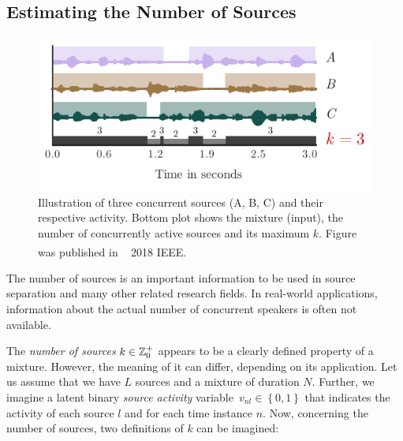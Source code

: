 \subsection{Estimating the Number of Sources}%
\label{sub:count_problemstatement}

\begin{figure}[ht!]
  \centering
  \includegraphics[width=0.8\columnwidth]{Chapters/08_Analysis_CountNet/figures/teaser.pdf}
  \caption{Illustration of three concurrent sources (A, B, C) and their respective activity. Bottom plot shows the mixture (input), the number of concurrently active sources and its maximum \(k\). Figure was published in ~\cite{stoeter18} \textsuperscript{\textregistered}2018 IEEE.}%
  \label{fig:teaser}%
\end{figure}

The number of sources is an important information to be used in source separation and many other related research fields.
In real-world applications, information about the actual number of concurrent speakers is often not available.
\par
The \emph{number of sources} \( k \in \mathbb{Z}^{+}_{0} \) appears to be a clearly defined property of a mixture. 
However, the meaning of it can differ, depending on its application.
Let us assume that we have \(L\) sources and a mixture of duration \(N\).
Further, we imagine a latent binary \textit{source activity} variable~$v_{nl}\in \left\{ 0,1 \right\}$ that indicates the activity of each source \(l\) and for each time instance \(n\).
Now, concerning the number of sources, two definitions of \(k\) can be imagined:

